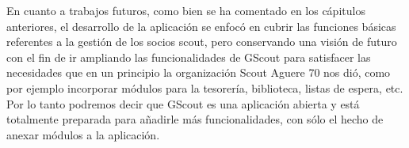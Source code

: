 En cuanto a trabajos futuros, como bien se ha comentado en los cápitulos anteriores, el desarrollo de la aplicación se enfocó en cubrir las funciones básicas
referentes a la gestión de los socios scout, pero conservando una visión de futuro con el fin de ir ampliando las funcionalidades de GScout
para satisfacer las necesidades que en un principio la organización Scout Aguere 70 nos dió, como por ejemplo incorporar módulos para la tesorería, biblioteca, listas de espera, etc.\\

Por lo tanto podremos decir que GScout es una aplicación abierta y está totalmente preparada para añadirle más funcionalidades, con sólo el hecho de anexar
módulos a la aplicación.